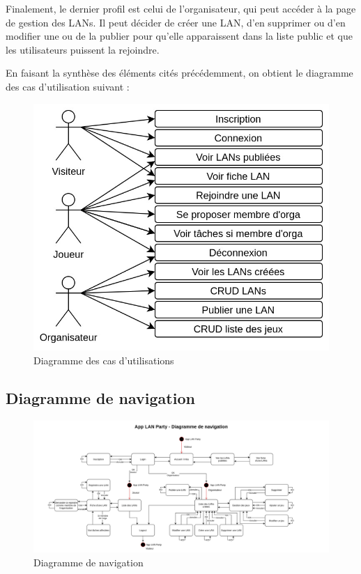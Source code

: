 \documentclass[12pt]{article}
\begin{document}
Finalement, le dernier profil est celui de l'organisateur, qui peut accéder à la page de gestion des LANs. Il peut décider de créer une LAN, d'en supprimer ou d'en modifier une ou de la publier pour qu'elle apparaissent dans la liste public et que les utilisateurs puissent la rejoindre.
\newline

En faisant la synthèse des éléments cités précédemment, on obtient le diagramme des cas d'utilisation suivant :

\begin{figure}[H]
\centering
\includegraphics[scale=.40]{images/cas_utilisation.jpg}
\caption{Diagramme des cas d'utilisations}
\label{}
\end{figure}

\subsection{Diagramme de navigation}
\begin{figure}[H]
\centering
\includegraphics[scale=0.21,angle=90,origin=c]{images/navigation.jpg}
\caption{Diagramme de navigation}
\label{}
\end{figure}
\end{document}
